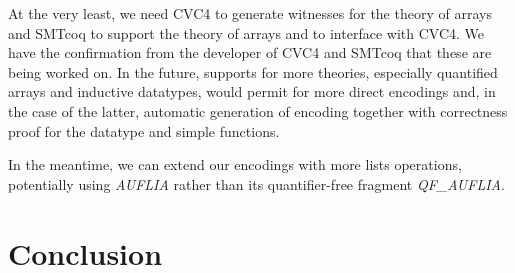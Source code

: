 \documentclass[preprint]{sigplanconf}
\begin{document}
At the very least, we need CVC4 to generate witnesses for the theory of arrays and SMTcoq to support the theory of arrays and to interface with CVC4. We have the confirmation from the developer of CVC4 and SMTcoq that these are being worked on. In the future, supports for more theories, especially quantified arrays and inductive datatypes, would permit for more direct encodings and, in the case of the latter, automatic generation of encoding together with correctness proof for the datatype and simple functions.

In the meantime, we can extend our encodings with more lists operations, potentially using \emph{AUFLIA} rather than its quantifier-free fragment \emph{QF\_AUFLIA}.
\section{Conclusion}
\end{document}
